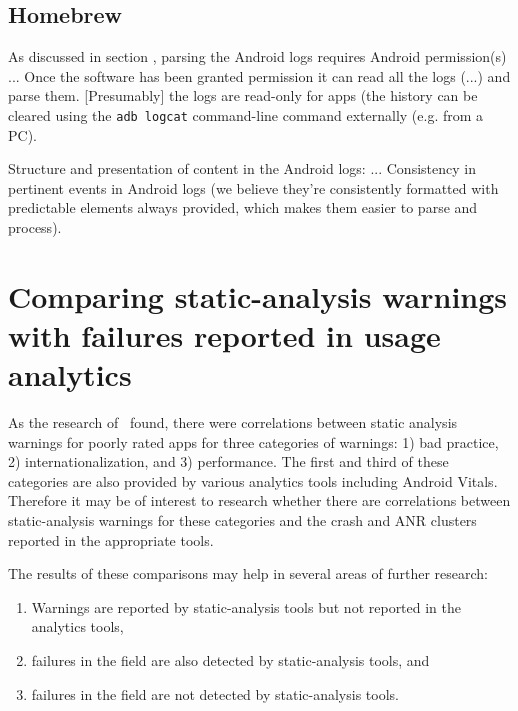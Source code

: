 \subsection{Homebrew}
As discussed in section \href{platform-level-analytics}{\emph{}}, parsing the Android logs requires Android permission(s) ... Once the software has been granted permission it can read all the logs (...) and parse them. [Presumably] the logs are read-only for apps (the history can be cleared using the \texttt{adb logcat} command-line command externally (e.g. from a PC).

Structure and presentation of content in the Android logs: ...
Consistency in pertinent events in Android logs (we believe they're consistently formatted with predictable elements always provided, which makes them easier to parse and process).



\section{Comparing static-analysis warnings with failures reported in usage analytics}
As the research of~\citep{khalid2016_examining_the_relationship_between_findbugs_warnings_and_app_ratings} found, there were correlations between static analysis warnings for poorly rated apps for three categories of warnings: 1) bad practice, 2) internationalization, and 3) performance. The first and third of these categories are also provided by various analytics tools including Android Vitals. Therefore it may be of interest to research whether there are correlations between static-analysis warnings for these categories and the crash and ANR clusters reported in the appropriate tools. 

The results of these comparisons may help in several areas of further research:
\begin{enumerate}
    \item Warnings are reported by static-analysis tools but not reported in the analytics tools,
    \item failures in the field are also detected by static-analysis tools, and
    \item failures in the field are not detected by static-analysis tools.
\end{enumerate}

